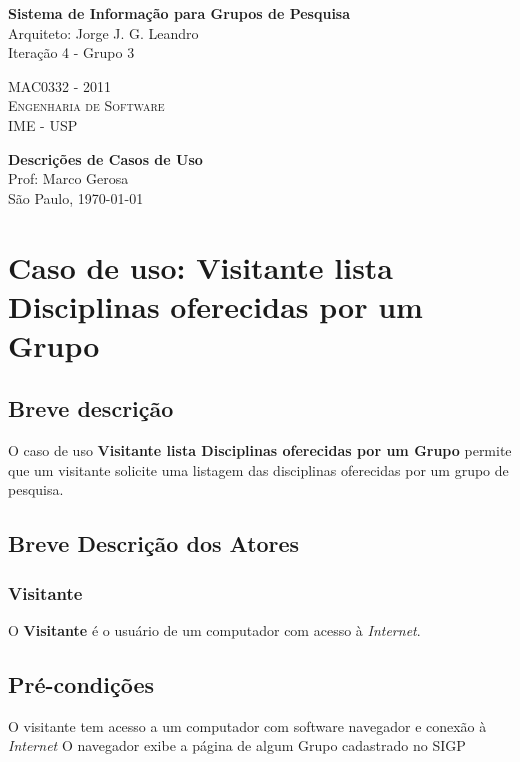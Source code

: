 \documentclass[11pt, a4paper,oneside]{book}
\begin{document}
\thispagestyle{empty}
\begin{center}
    \vspace*{0.2cm}
    \textbf{\Large{Sistema de Informação para Grupos de Pesquisa}}\\
	
    \vspace*{1.2cm}
    \Large{Arquiteto: Jorge J. G. Leandro}\\
    \Large{Iteração 4 - Grupo 3}
    
    \vskip 2cm
	\textsc{
	MAC0332 - 2011\\[-0.25cm] 
          	Engenharia de Software\\[-0.25cm] 	
	IME - USP\\[-0.25cm]
	}
    
    \vskip 1.5cm
    \textbf{Descrições de Casos de Uso}\\
    Prof: Marco Gerosa\\

	
    \vskip 0.5cm
   {\normalsize São Paulo, \today}
\end{center}


\chapter[Caso de Uso]{Caso de uso: \bf Visitante lista Disciplinas oferecidas por um Grupo}
\label{cap:casodeuso}	

\section{Breve descrição}

O caso de uso \textbf{Visitante lista Disciplinas oferecidas por um Grupo} permite que um visitante solicite uma listagem das disciplinas oferecidas por um grupo de pesquisa.

\section{Breve Descrição dos Atores}

\subsection{Visitante}

O \textbf{Visitante} é o usuário de um computador com acesso à \emph{Internet}.

\section{Pré-condições}
O visitante tem acesso a um computador com software navegador e conexão à \emph{Internet}
O navegador exibe a página de algum Grupo cadastrado no SIGP
\end{document}
